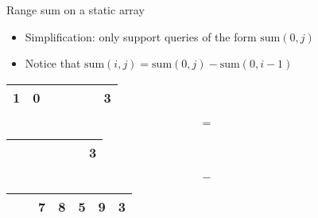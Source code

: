 \documentclass[12pt,t]{beamer}
\newcommand{\bi}{\begin{itemize}}
\newcommand{\ei}{\end{itemize}}
\begin{document}
\begin{frame}{Range sum on a static array}
    \bi
        \item Simplification: only support queries of the form $\mathrm{sum}(0, j)$
        \item Notice that $\mathrm{sum}(i,j) = \mathrm{sum}(0,j) - \mathrm{sum}(0,i-1)$
    \ei

    \begin{center}
        \begin{tabular}{|c|c|c|c|c|c|c|}
            \hline
            1 & 0 & \color{vhilight}{7} & \color{vhilight}{8} & \color{vhilight}{5} & \color{vhilight}{9} & 3 \\
            \hline
        \end{tabular}
    \end{center}
    $$=$$
    \begin{center}
        \begin{tabular}{|c|c|c|c|c|c|c|}
            \hline
            \color{vhilight}{1} & \color{vhilight}{0} & \color{vhilight}{7} & \color{vhilight}{8} & \color{vhilight}{5} & \color{vhilight}{9} & 3 \\
            \hline
        \end{tabular}
    \end{center}
    $$-$$
    \begin{center}
        \begin{tabular}{|c|c|c|c|c|c|c|}
            \hline
            \color{vhilight}{1} & \color{vhilight}{0} & 7 & 8 & 5 & 9 & 3 \\
            \hline
        \end{tabular}
    \end{center}
\end{frame}
\end{document}
